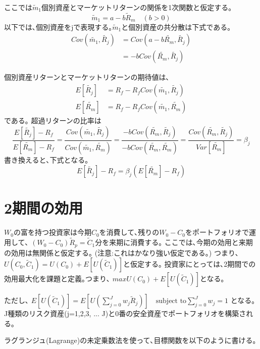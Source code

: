 \documentclass[uplatex,a4paper]{jsarticle}
\begin{document}
ここでは$\widetilde m_1$個別資産とマーケットリターンの関係を1次関数と仮定する｡
\begin{equation*}
\widetilde m_1 = a -b \widetilde R_m   \quad  (b > 0)
\end{equation*}
以下では､個別資産をjで表現する｡$\widetilde m_1$と個別資産の共分散は下式である｡
\begin{align*}
Cov(\widetilde{m_1}, \widetilde{R_j})
& = Cov(a - b \widetilde{R_m}, \widetilde{R_j}) \\
& = - b  Cov( \widetilde{R_m}, \widetilde{R_j})
\end{align*}

個別資産リターンとマーケットリターンの期待値は､
\begin{align*}
E [ \widetilde{R_j}]
& = R_f - R_f Cov(\widetilde{m_1}, \widetilde{R_j}) \\
E [ \widetilde{R_m}]
& = R_f - R_f Cov(\widetilde{m_1}, \widetilde{R_m})
\end{align*}
である｡
超過リターンの比率は
\begin{equation*}
\frac{E [ \widetilde{R_j}] - R_f }{E [ \widetilde{R_m}] - R_f}
= \frac{Cov(\widetilde{m_1}, \widetilde{R_j})}{Cov(\widetilde{m_1}, \widetilde{R_m}) }
= \frac{-b Cov(\widetilde{R_m}, \widetilde{R_j})}{-b Cov(\widetilde{R_m}, \widetilde{R_m}) }
= \frac{Cov(\widetilde{R_m}, \widetilde{R_j})}{Var[\widetilde{R_m}]}
= \beta_j
\end{equation*}
書き換えると､下式となる｡
\begin{equation*}
E [ \widetilde{R_j}] - R_f = \beta_j (E [ \widetilde{R_m}] - R_f)
\end{equation*}


\section{2期間の効用}
$W_0$の富を持つ投資家は今期$C_0$を消費して､残りの$W_0 - C_0$をポートフォリオで運用して､
$(W_0 - C_0) \widetilde R_p = \widetilde C_1$分を来期に消費する｡
ここでは､今期の効用と来期の効用は無関係と仮定する｡
(注意:これはかなり強い仮定である｡)
つまり､
$U(C_0, \widetilde C_1) = U(C_0) + E[U(\widetilde C_1)]$と仮定する｡
投資家にとっては､2期間での効用最大化を課題と定義｡つまり､
$ max U(C_0) + E[U(\widetilde C_1)]$となる｡

ただし､
$E[U(\widetilde C_1)] = E[U(\sum_{j=0}^{J} w_j \widetilde R_j)]  \quad
\text{subject to}  \sum_{j=0}^{J} w_j = 1$ となる｡
J種類のリスク資産(j=1,2,3, ... J)と0番の安全資産でポートフォリオを構築される｡


ラグランジュ(Lagrange)の未定乗数法を使って､目標関数を以下のように書ける｡
\end{document}
